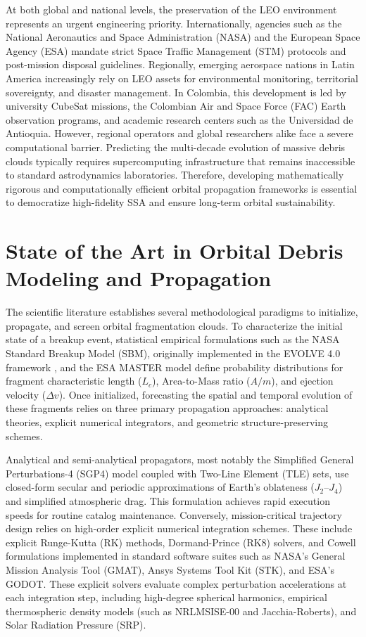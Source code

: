 At both global and national levels, the preservation of the LEO environment represents an urgent engineering priority. Internationally, agencies such as the National Aeronautics and Space Administration (NASA) and the European Space Agency (ESA) mandate strict Space Traffic Management (STM) protocols and post-mission disposal guidelines. Regionally, emerging aerospace nations in Latin America increasingly rely on LEO assets for environmental monitoring, territorial sovereignty, and disaster management. In Colombia, this development is led by university CubeSat missions, the Colombian Air and Space Force (FAC) Earth observation programs, and academic research centers such as the Universidad de Antioquia. However, regional operators and global researchers alike face a severe computational barrier. Predicting the multi-decade evolution of massive debris clouds typically requires supercomputing infrastructure that remains inaccessible to standard astrodynamics laboratories. Therefore, developing mathematically rigorous and computationally efficient orbital propagation frameworks is essential to democratize high-fidelity SSA and ensure long-term orbital sustainability.

\section{State of the Art in Orbital Debris Modeling and Propagation}
\label{sec:sota}

The scientific literature establishes several methodological paradigms to initialize, propagate, and screen orbital fragmentation clouds. To characterize the initial state of a breakup event, statistical empirical formulations such as the NASA Standard Breakup Model (SBM), originally implemented in the EVOLVE 4.0 framework \cite{johnson_nasas_2001}, and the ESA MASTER model define probability distributions for fragment characteristic length ($L_c$), Area-to-Mass ratio ($A/m$), and ejection velocity ($\Delta v$). Once initialized, forecasting the spatial and temporal evolution of these fragments relies on three primary propagation approaches: analytical theories, explicit numerical integrators, and geometric structure-preserving schemes.

Analytical and semi-analytical propagators, most notably the Simplified General Perturbations-4 (SGP4) model coupled with Two-Line Element (TLE) sets, use closed-form secular and periodic approximations of Earth's oblateness ($J_2$--$J_4$) and simplified atmospheric drag. This formulation achieves rapid execution speeds for routine catalog maintenance. Conversely, mission-critical trajectory design relies on high-order explicit numerical integration schemes. These include explicit Runge-Kutta (RK) methods, Dormand-Prince (RK8) solvers, and Cowell formulations implemented in standard software suites such as NASA's General Mission Analysis Tool (GMAT), Ansys Systems Tool Kit (STK), and ESA's GODOT. These explicit solvers evaluate complex perturbation accelerations at each integration step, including high-degree spherical harmonics, empirical thermospheric density models (such as NRLMSISE-00 and Jacchia-Roberts), and Solar Radiation Pressure (SRP).

